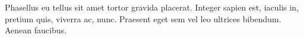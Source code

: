 {\ttfamily\raggedright
Phasellus eu tellus sit amet tortor gravida placerat. Integer sapien est,
iaculis in, pretium quis, viverra ac, nunc. Praesent eget sem vel leo ultrices
bibendum. Aenean faucibus.
\par}
